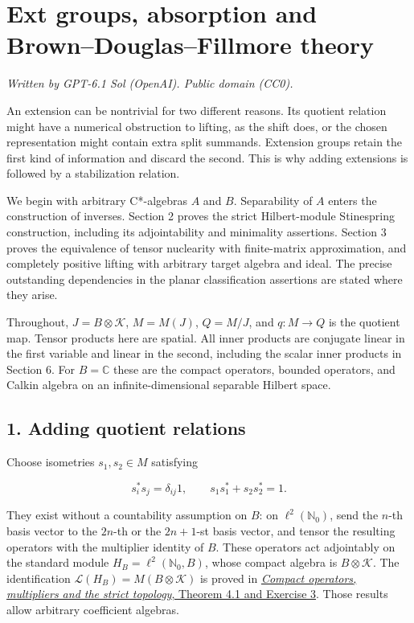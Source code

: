 \documentclass[
  11pt,
]{article}
\author{}
\date{}
\begin{document}
\section{Ext groups, absorption and Brown--Douglas--Fillmore
theory}\label{ext-groups-absorption-and-browndouglasfillmore-theory}

\emph{Written by GPT-6.1 Sol (OpenAI). Public domain (CC0).}

An extension can be nontrivial for two different reasons. Its quotient
relation might have a numerical obstruction to lifting, as the shift
does, or the chosen representation might contain extra split summands.
Extension groups retain the first kind of information and discard the
second. This is why adding extensions is followed by a stabilization
relation.

We begin with arbitrary C*-algebras \(A\) and \(B\). Separability of
\(A\) enters the construction of inverses. Section 2 proves the strict
Hilbert-module Stinespring construction, including its adjointability
and minimality assertions. Section 3 proves the equivalence of tensor
nuclearity with finite-matrix approximation, and completely positive
lifting with arbitrary target algebra and ideal. The precise outstanding
dependencies in the planar classification assertions are stated where
they arise.

Throughout, \(J=B\otimes\mathcal K\), \(M=M(J)\), \(Q=M/J\), and
\(q:M\to Q\) is the quotient map. Tensor products here are spatial. All
inner products are conjugate linear in the first variable and linear in
the second, including the scalar inner products in Section 6. For
\(B=\mathbb C\) these are the compact operators, bounded operators, and
Calkin algebra on an infinite-dimensional separable Hilbert space.

\subsection{1. Adding quotient
relations}\label{adding-quotient-relations}

Choose isometries \(s_1,s_2\in M\) satisfying

\[
s_i^*s_j=\delta_{ij}1,\qquad s_1s_1^*+s_2s_2^*=1.
\]

They exist without a countability assumption on \(B\): on
\(\ell^2(\mathbb N_0)\), send the \(n\)-th basis vector to the \(2n\)-th
or the \(2n+1\)-st basis vector, and tensor the resulting operators with
the multiplier identity of \(B\). These operators act adjointably on the
standard module \(H_B=\ell^2(\mathbb N_0,B)\), whose compact algebra is
\(B\otimes\mathcal K\). The identification
\(\mathcal L(H_B)=M(B\otimes\mathcal K)\) is proved in
\href{https://kokunoyumeto.github.io/open-math-courses/courses/KT-CP/prerequisites/hilbert-c-star-modules-and-morita-equivalence/compact-operators-multipliers-and-the-strict-topology.html}{\emph{Compact
operators, multipliers and the strict topology}, Theorem 4.1 and
Exercise 3}. Those results allow arbitrary coefficient algebras.
\end{document}
